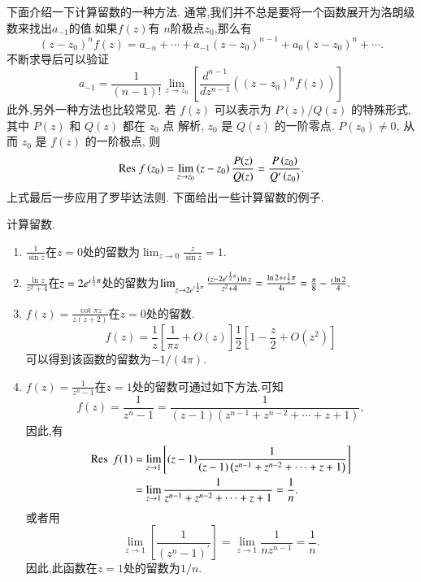 下面介绍一下计算留数的一种方法.
通常,我们并不总是要将一个函数展开为洛朗级数来找出$a_{-1}$的值.如果$f(z)$有
$n$阶极点$z_0$,那么有
\begin{equation}
    \left(z-z_0\right)^n f(z)=a_{-n}+\cdots+a_{-1}\left(z-z_0\right)^{n-1}+a_0\left(z-z_0\right)^n+\cdots .
\end{equation}
不断求导后可以验证
\begin{equation}
    a_{-1}=\frac{1}{(n-1) !} \lim _{z \to z_0}\left[\frac{d^{n-1}}{d z^{n-1}}\left(\left(z-z_0\right)^n f(z)\right)\right]
\end{equation}
此外,另外一种方法也比较常见. 若 $f(z)$ 可以表示为 $P(z) / Q(z)$ 的特殊形式, 其中 $P(z)$ 和 $Q(z)$ 都在 $z_0$ 点 解析, $z_0$ 是 $Q(z)$ 的一阶零点. $P\left(z_0\right) \neq 0$, 从而 $z_0$ 是 $f(z)$ 的一阶极点, 则
\begin{equation}
    {\mathrm{Res}\;} f\left(z_0\right)=\lim _{z \to z_0}\left(z-z_0\right) \frac{P(z)}{Q(z)}=\frac{P\left(z_0\right)}{Q^{\prime}\left(z_0\right)} .
\end{equation}
上式最后一步应用了罗毕达法则.
下面给出一些计算留数的例子.
\begin{example}
计算留数.
\end{example}
\begin{solution}
    
    \begin{enumerate}
        \item $\frac{1}{\sin z}$在$z=0$处的留数为$\lim_{z\to 0} \frac{z}{\sin{z}} = 1$.
        \item $\frac{\ln{z}}{z^2 + 4}$在$z=2e^{\imath {\frac{1}{2}} \pi}$处的留数为$\lim_{z\to 2e^{\imath {\frac{1}{2}} \pi}} \frac{(z-2e^{\imath {\frac{1}{2}}\pi})\ln{z} }{z^2 + 4} = 
        \frac{\ln 2 + \imath {\frac{1}{2}} \pi}{4\imath} = \frac{\pi}{8} - \frac{\imath\ln{2}}{4}.$
        \item $f(z) = \frac{\cot{\pi z}}{z(z+2)}$在$z=0$处的留数.\\
            $$
              f(z) = \frac{1}{z} \left[\frac{1}{\pi z} + O(z) \right]\frac{1}{2} \left[1 - \frac{z}{2} + O(z^2)\right]  
            $$
            可以得到该函数的留数为$-1/(4\pi)$.
        \item $f(z) = \frac{1}{z^n - 1}$在$z=1$处的留数可通过如下方法.可知
        $$
            f(z)=\frac{1}{z^n-1}=\frac{1}{(z-1)\left(z^{n-1}+z^{n-2}+\cdots+z+1\right)},
        $$
        因此,有
        $$
            \begin{aligned}
                \operatorname{{\mathrm{Res}\;}} f(1) & =\lim _{z \to 1}\left[(z-1) \frac{1}{(z-1)\left(z^{n-1}+z^{n-2}+\cdots+z+1\right)}\right] \\
                & =\lim _{z \to 1} \frac{1}{z^{n-1}+z^{n-2}+\cdots+z+1}=\frac{1}{n} .
            \end{aligned}
        $$
        或者用 $$
        \lim _{z \to 1}\left[\frac{1}{\left(z^n-1\right)^{\prime}}\right]=\lim _{z \to 1} \frac{1}{n z^{n-1}}=\frac{1}{n} .
        $$ 因此,此函数在$z=1$处的留数为$1/n$.
    \end{enumerate}
\end{solution}

